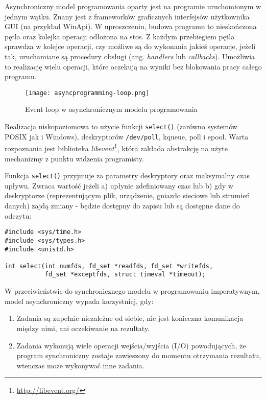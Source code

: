 Asynchroniczny model programowania oparty jest na programie uruchomionym w jednym wątku. Znany jest z frameworków graficznych interfejsów użytkownika GUI (na przykład WinApi). W uproszczeniu, budowa programu to nieskończona pętla oraz kolejka operacji odłożona na stos. Z każdym przebiegiem pętla sprawdza w kolejce operacji, czy możliwe są do wykonania jakieś operacje, jeżeli tak, uruchamiane są procedury obsługi (ang. \emph{handlers} lub \emph{callbacks}). Umożliwia to realizację wielu operacji, które oczekują na wyniki bez blokowania pracy całego programu.

\begin{figure}[H]
  \caption[Event loop w asynchronicznym modelu programowania]{Event loop w asynchronicznym modelu programowania}
  \centering
    \texttt{[image: asyncprogramming-loop.png]}
\end{figure}

Realizacja niskopoziomowa to użycie funkcji \lstinline{select()} (zarówno systemów POSIX jak i Windows), deskryptorów \lstinline{/dev/poll}, kqueue, poll i epool. Warta rozpoznania jest biblioteka \emph{libevent}\footnote{\url{http://libevent.org/}}, która zakłada abstrakcję na użyte mechanizmy z punktu widzenia programisty\cite{programming-async-sockets}.

Funkcja \lstinline{select()} przyjmuje za parametry deskryptory oraz maksymalny czas upływu. Zwraca wartość jeżeli a) upłynie zdefiniowany czas lub b) gdy w deskryptorze (reprezentującym plik, urządzenie, gniazdo sieciowe lub strumień danych) zajdą zmiany - będzie dostępny do zapisu lub są dostępne dane do odczytu:

\lstset{language=C}
\begin{lstlisting}
#include <sys/time.h>
#include <sys/types.h>
#include <unistd.h>

int select(int numfds, fd_set *readfds, fd_set *writefds,
           fd_set *exceptfds, struct timeval *timeout);
\end{lstlisting}

W przeciwieństwie do synchronicznego modelu w programowaniu imperatywnym, model asynchroniczny wypada korzystniej, gdy\cite{programming-async}:

\begin{enumerate}
  \item Zadania są zupełnie niezależne od siebie, nie jest konieczna komunikacja między nimi, ani oczekiwanie na rezultaty.
  \item Zadania wykonują wiele operacji wejścia/wyjścia (I/O) powodujących, że program synchroniczny zostaje zawieszony do momentu otrzymania rezultatu, wtenczas może wykonywać inne zadania.
\end{enumerate}

